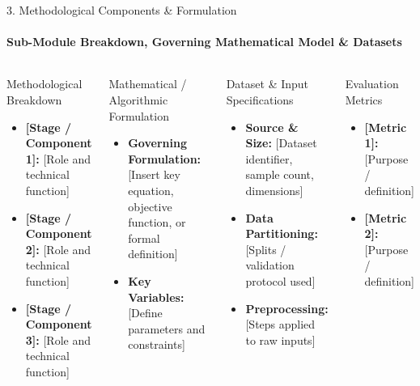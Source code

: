\documentclass[aspectratio=169, 11pt]{beamer}
\begin{document}
\begin{frame}{3. Methodological Components \& Formulation}
    \framesubtitle{Sub-Module Breakdown, Governing Mathematical Model \& Datasets}
    \begin{columns}[T]
        \begin{block}{Methodological Breakdown}
            \footnotesize
            \begin{itemize}
                \item \textbf{[Stage / Component 1]:} {[Role and technical function]}
                \item \textbf{[Stage / Component 2]:} {[Role and technical function]}
                \item \textbf{[Stage / Component 3]:} {[Role and technical function]}
            \end{itemize}
        \end{block}

        \begin{block}{Mathematical / Algorithmic Formulation}
            \footnotesize
            \begin{itemize}
                \item \textbf{Governing Formulation:} {[Insert key equation, objective function, or formal definition]}
                \item \textbf{Key Variables:} {[Define parameters and constraints]}
            \end{itemize}
        \end{block}

        \begin{block}{Dataset \& Input Specifications}
            \footnotesize
            \begin{itemize}
                \item \textbf{Source \& Size:} {[Dataset identifier, sample count, dimensions]}
                \item \textbf{Data Partitioning:} {[Splits / validation protocol used]}
                \item \textbf{Preprocessing:} {[Steps applied to raw inputs]}
            \end{itemize}
        \end{block}

        \begin{block}{Evaluation Metrics}
            \footnotesize
            \begin{itemize}
                \item \textbf{[Metric 1]:} {[Purpose / definition]}
                \item \textbf{[Metric 2]:} {[Purpose / definition]}
            \end{itemize}
        \end{block}
    \end{columns}
\end{frame}
\end{document}
